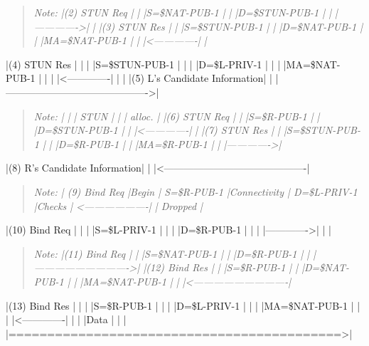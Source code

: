\documentclass{article}
\begin{document}
\begin{quote}
\textit{Note: |(2) STUN Req  |              | |S=\$NAT-PUB-1  |              | |D=\$STUN-PUB-1 |              | |------------->|              | |(3) STUN Res  |              | |S=\$STUN-PUB-1 |              | |D=\$NAT-PUB-1  |              | |MA=\$NAT-PUB-1 |              | |<-------------|              |}
\end{quote}

|(4) STUN Res  |              |              | |S=\$STUN-PUB-1 |              |              | |D=\$L-PRIV-1   |              |              | |MA=\$NAT-PUB-1 |              |              | |<-------------|              |              | |(5) L's Candidate Information|              | |------------------------------------------->|

\begin{quote}
\textit{Note: |              |              | STUN |              |              | alloc. |              |(6) STUN Req  | |              |S=\$R-PUB-1    | |              |D=\$STUN-PUB-1 | |              |<-------------| |              |(7) STUN Res  | |              |S=\$STUN-PUB-1 | |              |D=\$R-PUB-1    | |              |MA=\$R-PUB-1   | |              |------------->|}
\end{quote}

|(8) R's Candidate Information|              | |<-------------------------------------------|

\begin{quote}
\textit{Note: |         (9) Bind Req        |Begin |         S=\$R-PUB-1          |Connectivity |         D=\$L-PRIV-1         |Checks |         <-------------------| |         Dropped             |}
\end{quote}

|(10) Bind Req |              |              | |S=\$L-PRIV-1   |              |              | |D=\$R-PUB-1    |              |              | |------------->|              |              |

\begin{quote}
\textit{Note: |(11) Bind Req |              | |S=\$NAT-PUB-1  |              | |D=\$R-PUB-1    |              | |---------------------------->| |(12) Bind Res |              | |S=\$R-PUB-1    |              | |D=\$NAT-PUB-1  |              | |MA=\$NAT-PUB-1 |              | |<----------------------------|}
\end{quote}

|(13) Bind Res |              |              | |S=\$R-PUB-1    |              |              | |D=\$L-PRIV-1   |              |              | |MA=\$NAT-PUB-1 |              |              | |<-------------|              |              | |Data          |              |              | |===========================================>|
\end{document}
